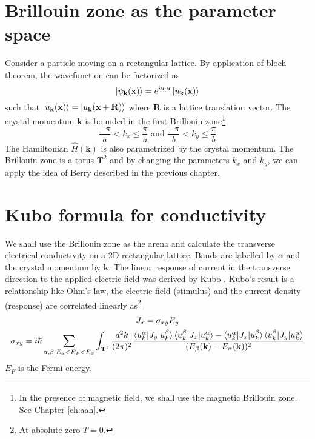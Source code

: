 \section{Brillouin zone as the parameter space}
Consider a particle moving on a rectangular lattice. By application of bloch theorem, the wavefunction can be factorized as
\begin{equation*}
 \ket{\psi_{\mathbf{k}}(\mathbf{x})} = e^{i\mathbf{x}\cdot\mathbf{x}}\ket{u_{\mathbf{k}}(\mathbf{x})}
\end{equation*} such that $\ket{u_{\mathbf{k}}(\mathbf{x})} = \ket{u_{\mathbf{k}}(\mathbf{x}+\mathbf{R})}$ where $\mathbf{R}$ is a lattice translation vector.
The crystal momentum $\mathbf{k}$ is bounded in the first Brillouin zone\footnote{In the presence of magnetic field, we shall use the magnetic Brillouin zone. See Chapter \ref{ch:aah}.}
\begin{equation*}
 \frac{-\pi}{a} < k_{x} \leq \frac{\pi}{a} \text{ and } \frac{-\pi}{b} < k_{y} \leq \frac{\pi}{b}
\end{equation*} The Hamiltonian $\hat{H}(\mathbf{k})$ is also parametrized by the crystal momentum. The Brillouin zone is a torus $\mathbf{T}^2$ and by changing the parameters
$k_{x}$ and $k_{y}$, we can apply the idea of Berry described in the previous chapter.

\section{Kubo formula for conductivity}
We shall use the Brillouin zone as the arena and calculate the transverse electrical conductivity on a 2D rectangular lattice. Bands are labelled by $\alpha$ and the crystal momentum by $\mathbf{k}$.
The linear response of current in the transverse direction to the applied electric field was derived by Kubo \cite{kubo1956general,kubo1957statistical,tong2016lectures,kohmoto1985topological,thouless1982quantized}.
Kubo's result is a relationship like Ohm's law, the electric field (stimulus) and the current density (response) are correlated linearly as\footnote{At absolute zero $T=0$.}
\begin{gather}
 J_{x} = \sigma_{xy} E_{y} \\
 \sigma_{xy} = i\hbar \sum_{\alpha,\beta | E_{\alpha}<E_{F}<E_{\beta}}\int_{\mathbf{T}^2}\frac{d^2 k}{(2\pi)^2} \frac{\braket{u_k^\alpha |J_{y}|u_k^\beta}\braket{u_k^\beta |J_{x}|u_k^\alpha} - \braket{u_k^\alpha |J_{x}|u_k^\beta}\braket{u_k^\beta |J_{y}|u_k^\alpha}}{(E_{\beta}(\mathbf{k})-E_{\alpha}(\mathbf{k}))^2}
\end{gather}
$E_{F}$ is the Fermi energy.

